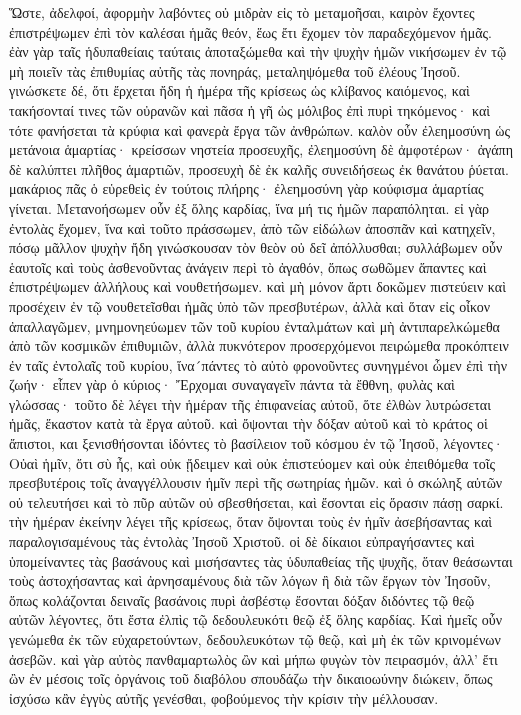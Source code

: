 Ὥστε, ἀδελφοί, ἀφορμὴν λαβόντες οὐ μιδρὰν εἰς τὸ μεταμοῆσαι, καιρὸν ἔχοντες ἐπιστρέψωμεν ἐπὶ τὸν καλέσαι ἡμᾶς θεόν, ἕως ἔτι ἔχομεν τὸν παραδεχόμενον ἡμᾶς. ἐὰν γὰρ ταῖς ἡδυπαθείαις ταύταις ἀποταξώμεθα καὶ τὴν ψυχὴν ἡμῶν νικήσωμεν ἐν τῷ μὴ ποιεῖν τὰς ἐπιθυμίας αὐτῆς τὰς πονηράς, μεταληψόμεθα τοῦ ἐλέους Ἰησοῦ. γινώσκετε δέ, ὅτι ἔρχεται ἤδη ἡ ἡμέρα τῆς κρίσεως ὡς κλίβανος καιόμενος, καὶ τακήσονταί τινες τῶν οὐρανῶν καὶ πᾶσα ἡ γῆ ὡς μόλιβος ἐπὶ πυρὶ τηκόμενος· καὶ τότε φανήσεται τὰ κρύφια καὶ φανερὰ ἔργα τῶν ἀνθρώπων. καλὸν οὖν ἐλεημοσύνη ὡς μετάνοια ἁμαρτίας· κρείσσων νηστεία προσευχῆς, ἐλεημοσύνη δὲ ἀμφοτέρων· ἀγάπη δὲ καλύπτει πλῆθος ἁμαρτιῶν, προσευχὴ δὲ ἐκ καλῆς συνειδήσεως ἐκ θανάτου ῥύεται. μακάριος πᾶς ὁ εὑρεθεὶς ἐν τούτοις πλήρης· ἐλεημοσύνη γὰρ κούφισμα ἁμαρτίας γίνεται. 
Μετανοήσωμεν οὖν ἐξ ὅλης καρδίας, ἵνα μή τις ἡμῶν παραπόληται. εἰ γὰρ ἐντολὰς ἔχομεν, ἵνα καὶ τοῦτο πράσσωμεν, ἀπὸ τῶν εἰδώλων ἀποσπᾶν καὶ κατηχεῖν, πόσῳ μᾶλλον ψυχὴν ἤδη γινώσκουσαν τὸν θεὸν οὐ δεῖ ἀπόλλυσθαι; συλλάβωμεν οὖν ἑαυτοῖς καὶ τοὺς ἀσθενοῦντας ἀνάγειν περὶ τὸ ἀγαθόν, ὅπως σωθῶμεν ἅπαντες καὶ ἐπιστρέψωμεν ἀλλήλους καὶ νουθετήσωμεν. καὶ μὴ μόνον ἄρτι δοκῶμεν πιστεύειν καὶ προσέχειν ἐν τῷ νουθετεῖσθαι ἡμᾶς ὑπὸ τῶν πρεσβυτέρων, ἀλλὰ καὶ ὅταν εἰς οἶκον ἀπαλλαγῶμεν, μνημονηεύωμεν τῶν τοῦ κυρίου ἐνταλμάτων καὶ μὴ ἀντιπαρελκώμεθα ἀπὸ τῶν κοσμικῶν ἐπιθυμιῶν, ἀλλὰ πυκνότερον προσερχόμενοι πειρώμεθα προκόπτειν ἐν ταῖς ἐντολαῖς τοῦ κυρίου, ἵνα´πάντες τὸ αὐτὸ φρονοῦντες συνηγμένοι ὦμεν ἐπὶ τὴν ζωήν· εἶπεν γὰρ ὁ κύριος· Ἔρχομαι συναγαγεῖν πάντα τὰ ἔθθνη, φυλὰς καὶ γλώσσας· τοῦτο δὲ λέγει τὴν ἡμέραν τῆς ἐπιφανείας αὐτοῦ, ὅτε ἐλθὼν λυτρώσεται ἡμᾶς, ἕκαστον κατὰ τὰ ἔργα αὐτοῦ. καὶ ὄψονται τὴν δόξαν αὐτοῦ καὶ τὸ κράτος οἱ ἄπιστοι, και ξενισθήσονται ἰδόντες τὸ βασίλειον τοῦ κόσμου ἐν τῷ Ἰησοῦ, λέγοντες· Οὐαὶ ἡμῖν, ὅτι σὺ ἦς, καὶ οὐκ ᾔδειμεν καὶ οὐκ ἐπιστεύομεν καὶ οὐκ ἐπειθόμεθα τοῖς πρεσβυτέροις τοῖς ἀναγγέλλουσιν ἡμῖν περὶ τῆς σωτηρίας ἡμῶν. καὶ ὁ σκώληξ αὐτῶν οὐ τελευτήσει καὶ τὸ πῦρ αὐτῶν οὐ σβεσθήσεται, καὶ ἔσονται εἰς ὅρασιν πάσῃ σαρκί. τὴν ἡμέραν ἐκείνην λέγει τῆς κρίσεως, ὅταν ὄψονται τοὺς ἐν ἡμῖν ἀσεβήσαντας καὶ παραλογισαμένους τὰς ἐντολὰς Ἰησοῦ Χριστοῦ. οἱ δὲ δίκαιοι εὐπραγήσαντες καὶ ὑπομείναντες τὰς βασάνους καὶ μισήσαντες τὰς ὑδυπαθείας τῆς ψυχῆς, ὅταν θεάσωνται τοὺς ἀστοχήσαντας καὶ ἀρνησαμένους διὰ τῶν λόγων ἢ διὰ τῶν ἔργων τὸν Ἰησοῦν, ὅπως κολάζονται δειναῖς βασάνοις πυρὶ ἀσβέστῳ ἔσονται δόξαν διδόντες τῷ θεῷ αὐτῶν λέγοντες, ὅτι ἔστα ἐλπὶς τῷ δεδουλευκότι θεῷ ἐξ ὅλης καρδίας.
Καὶ ἡμεῖς οὖν γενώμεθα ἐκ τῶν εὐχαρετούντων, δεδουλευκότων τῷ θεῷ, καὶ μὴ ἐκ τῶν κρινομένων ἀσεβῶν. καὶ γὰρ αὐτὸς πανθαμαρτωλὸς ὢν καὶ μήπω φυγὼν τὸν πειρασμόν, ἀλλ’ ἔτι ὢν ἐν μέσοις τοῖς ὀργάνοις τοῦ διαβόλου σπουδάζω τὴν δικαιοωύνην διώκειν, ὅπως ἰσχύσω κἂν ἐγγὺς αὐτῆς γενέσθαι, φοβούμενος τὴν κρίσιν τὴν μέλλουσαν.
